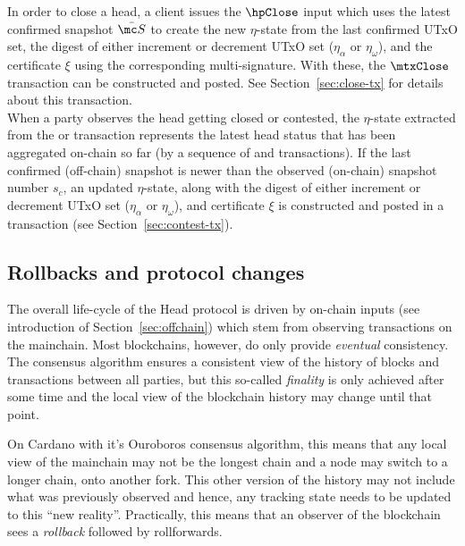 \quad In order to close a head, a client issues the
$\hpClose$ input which uses the latest confirmed snapshot $\bar{\mc S}$ to
create the new $\eta$-state from the last confirmed UTxO set, the digest of
either increment or decrement UTxO set ($\eta_\alpha$ or $\eta_\omega$), and the certificate
$\xi$ using the corresponding multi-signature. With these, the $\mtxClose$ transaction
can be constructed and posted. See Section~\ref{sec:close-tx} for details about this
transaction. \\

\quad When a party observes
the head getting closed or contested, the $\eta$-state extracted from the
\mtxClose{} or \mtxContest{} transaction represents the latest head status that
has been aggregated on-chain so far (by a sequence of \mtxClose{} and
\mtxContest{} transactions). If the last confirmed (off-chain) snapshot is newer
than the observed (on-chain) snapshot number $s_{c}$, an updated $\eta$-state,
along with the digest of either increment or decrement UTxO set ($\eta_\alpha$ or $\eta_\omega$),
and certificate $\xi$ is constructed and posted in a \mtxContest{} transaction (see
Section~\ref{sec:contest-tx}).

\subsection{Rollbacks and protocol changes}\label{sec:rollbacks}

The overall life-cycle of the Head protocol is driven by on-chain inputs (see
introduction of Section~\ref{sec:offchain}) which stem from observing
transactions on the mainchain. Most blockchains, however, do only provide
\emph{eventual} consistency. The consensus algorithm ensures a consistent view
of the history of blocks and transactions between all parties, but this
so-called \emph{finality} is only achieved after some time and the local view of
the blockchain history may change until that point.

On Cardano with it's Ouroboros consensus algorithm, this means that any local
view of the mainchain may not be the longest chain and a node may switch to a
longer chain, onto another fork. This other version of the history may not
include what was previously observed and hence, any tracking state needs to be
updated to this ``new reality''. Practically, this means that an observer of the
blockchain sees a \emph{rollback} followed by rollforwards.


